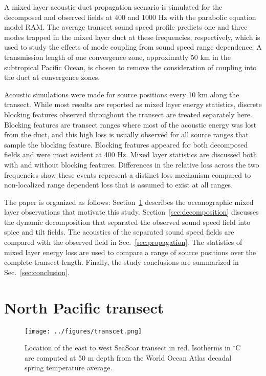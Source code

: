 \documentclass[preprint,NumberedRefs]{JASA}
\begin{document}
A mixed layer acoustic duct propagation scenario is simulated for the decomposed and observed fields at 400 and 1000 Hz with the parabolic equation model RAM\cite{collins93}. The average transect sound speed profile predicts one and three modes trapped in the mixed layer duct at these frequencies, respectively, which is used to study the effects of mode coupling from sound speed range dependence. A transmission length of one convergence zone\citep{jensen2011computational}, approximatly 50 km in the subtropical Pacific Ocean, is chosen to remove the consideration of coupling into the duct at convergence zones\citep{colosi2020observations}.

Acoustic simulations were made for source positions every 10 km along the transect. While most results are reported as mixed layer energy statistics, discrete blocking features\citep{colosi2020observations} observed throughout the transect are treated separately here. Blocking features are transect ranges where most of the acoustic energy was lost from the duct, and this high loss is usually observed for all source ranges that sample the blocking feature. Blocking features appeared for both decomposed fields and were most evident at 400 Hz. Mixed layer statistics are discussed both with and without blocking features. Differences in the relative loss across the two frequencies show these events represent a distinct loss mechanism compared to non-localized range dependent loss that is assumed to exist at all ranges.

The paper is organized as follows: Section~\ref{sec:transcet} describes the oceanographic mixed layer observations that motivate this study. Section~\ref{sec:decomposition} discusses the dynamic decomposition that separated the observed sound speed field into spice and tilt fields. The acoustics of the separated sound speed fields are compared with the observed field in Sec.~\ref{sec:propagation}. The statistics of mixed layer energy loss are used to compare a range of source positions over the complete transect length. Finally, the study conclusions are summarized in Sec.~\ref{sec:conclusion}.

\section{North Pacific transect}\label{sec:transcet}
\begin{figure}
\texttt{[image: ../figures/transcet.png]}
    \caption{\label{fig:transcet}{Location of the east to west SeaSoar transect in red. Isotherms in $^\circ$C are computed at 50 m depth from the World Ocean Atlas decadal spring temperature average\citep{WOA}.}}
\end{figure}
\end{document}
